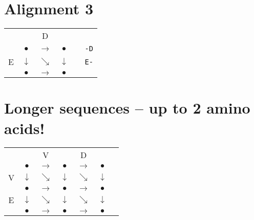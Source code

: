 \documentclass[landscape]{foils}
\begin{document}
\myNewSlide
\section*{Alignment 3}

{
\huge
\begin{center}
\begin{tabular}{ccccp{1in}c}
   &              & D             &  & & \\   
   & {\color{red} $\bullet$}    & {\color{black}$\rightarrow$} & {\color{black}$\bullet$} & & {\tt -D}\\
E  & {\color{red} $\downarrow$} & $\searrow$    & {\color{black} $\downarrow$ } & & {\tt E-} \\
   & {\color{red}$\bullet$ }& {\color{red}$\rightarrow$} & { \color{red}  $\bullet$ } & &
\end{tabular}
\end{center}
}


\myNewSlide
\section*{Longer sequences -- up to 2 amino acids!}

{
\huge
\begin{center}
\begin{tabular}{ccccccc}
   &              & V            &  & D & \\   
   & {\color{black} $\bullet$}    & {\color{black}$\rightarrow$} & {\color{black}$\bullet$}      & {\color{black}$\rightarrow$} & {\color{black}$\bullet$} \\
V  & {\color{black} $\downarrow$} & {\color{black}$\searrow$}    & {\color{black} $\downarrow$ } & {\color{black}$\searrow$}    & {\color{black} $\downarrow$ }  \\
   & {\color{black} $\bullet$ }   & {\color{black}$\rightarrow$} & {\color{black}  $\bullet$ }   & {\color{black}$\rightarrow$} & {\color{black}  $\bullet$ } \\   
E  & {\color{black} $\downarrow$} & {\color{black}$\searrow$}    & {\color{black} $\downarrow$ } & {\color{black}$\searrow$}    & {\color{black} $\downarrow$ }  \\
   & {\color{black} $\bullet$ }   & {\color{black}$\rightarrow$} & {\color{black}  $\bullet$ }   & {\color{black}$\rightarrow$} & {\color{black}  $\bullet$ } \\   
\end{tabular}
\end{center}
}
\end{document}
